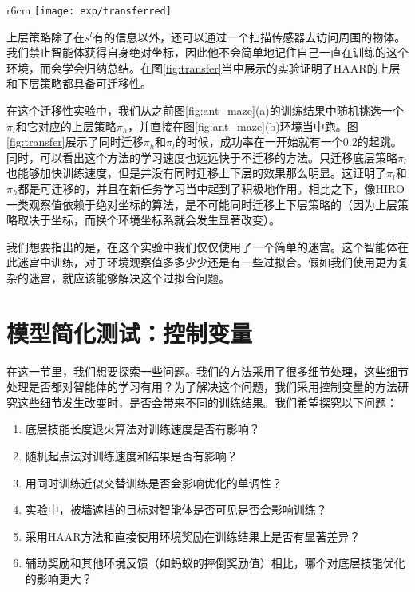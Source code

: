 \begin{wrapfigure}{r}{6cm}
\texttt{[image: exp/transferred]}
\setlength{\belowcaptionskip}{0.0cm}
\caption{在蚂蚁地图环境\ref{fig:exp_overview}(b)中，迁移来自(a)习得的策略。分别是迁移上下层策略，只迁移下层策略，和完全不迁移（即原版HAAR）的学习曲线。}
\label{fig:transfer}
\end{wrapfigure}

上层策略除了在$s^l$有的信息以外，还可以通过一个扫描传感器去访问周围的物体。我们禁止智能体获得自身绝对坐标，因此他不会简单地记住自己一直在训练的这个环境，而会学会归纳总结。在图\ref{fig:transfer}当中展示的实验证明了HAAR的上层和下层策略都具备可迁移性。

在这个迁移性实验中，我们从之前图\ref{fig:ant_maze}(a)的训练结果中随机挑选一个$\pi_l$和它对应的上层策略$\pi_h$，并直接在图\ref{fig:ant_maze}(b)环境当中跑。图\ref{fig:transfer}展示了同时迁移$\pi_h$和$\pi_l$的时候，成功率在一开始就有一个$0.2$的起跳。同时，可以看出这个方法的学习速度也远远快于不迁移的方法。只迁移底层策略$\pi_l$也能够加快训练速度，但是并没有同时迁移上下层的效果那么明显。这证明了$\pi_l$和$\pi_h$都是可迁移的，并且在新任务学习当中起到了积极地作用。相比之下，像HIRO\cite{HIRO}一类观察值依赖于绝对坐标的算法，是不可能同时迁移上下层策略的（因为上层策略取决于坐标，而换个环境坐标系就会发生显著改变）。

我们想要指出的是，在这个实验中我们仅仅使用了一个简单的迷宫。这个智能体在此迷宫中训练，对于环境观察值多多少少还是有一些过拟合。假如我们使用更为复杂的迷宫，就应该能够解决这个过拟合问题。


\section{模型简化测试：控制变量}
在这一节里，我们想要探索一些问题。我们的方法采用了很多细节处理，这些细节处理是否都对智能体的学习有用？为了解决这个问题，我们采用控制变量的方法研究这些细节发生改变时，是否会带来不同的训练结果。我们希望探究以下问题：
\begin{enumerate}
  \item 底层技能长度退火算法对训练速度是否有影响？
  \item 随机起点法对训练速度和结果是否有影响？
  \item 用同时训练近似交替训练是否会影响优化的单调性？
  \item 实验中，被墙遮挡的目标对智能体是否可见是否会影响训练？
  \item 采用HAAR方法和直接使用环境奖励在训练结果上是否有显著差异？
  \item 辅助奖励和其他环境反馈（如蚂蚁的摔倒奖励值）相比，哪个对底层技能优化的影响更大？
\end{enumerate}


